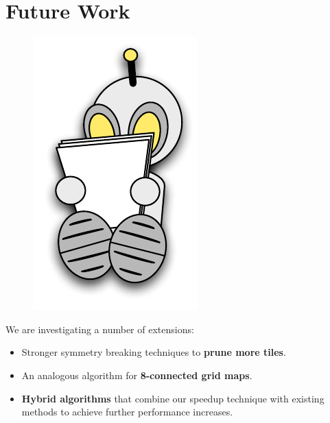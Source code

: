 \section{Future Work}
 \begin{figure}
		\includegraphics[width=0.15\columnwidth]{diagrams/robot_reading.pdf}
 \end{figure}
We are investigating a number of extensions:
\begin{itemize}
\item{Stronger symmetry breaking techniques to \textbf{prune more tiles}.}
\item{An analogous algorithm for \textbf{8-connected grid maps}.
}
\item{\textbf{Hybrid algorithms} that combine our speedup technique with existing methods
to achieve further performance increases.}
\end{itemize}

